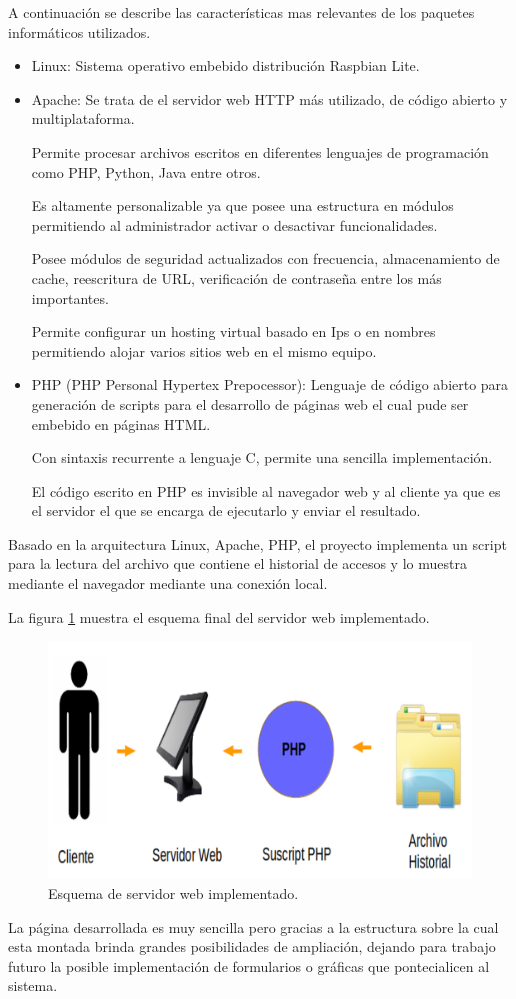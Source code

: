 A continuación se describe las características mas relevantes de los paquetes informáticos utilizados.

\begin{itemize}

\item Linux: Sistema operativo embebido distribución Raspbian Lite.

\item Apache: Se trata de el servidor web HTTP más utilizado, de código abierto y multiplataforma.

Permite procesar archivos escritos en diferentes lenguajes de programación como PHP, Python, Java entre otros.

Es altamente personalizable ya que posee una estructura en módulos permitiendo al administrador 	activar o desactivar funcionalidades.

Posee módulos de seguridad actualizados con frecuencia, almacenamiento de cache, reescritura de URL, verificación de contraseña entre los más importantes.

Permite configurar un hosting virtual basado en Ips o en nombres permitiendo alojar varios sitios web en el mismo equipo.

\item PHP (PHP Personal Hypertex Prepocessor): Lenguaje de código abierto para generación de scripts para el desarrollo de páginas web el cual pude ser embebido en páginas HTML.

Con sintaxis recurrente a lenguaje C, permite una sencilla implementación. 

El código escrito en PHP es invisible al navegador web y al cliente ya que es el servidor el que se encarga de ejecutarlo y enviar el resultado.

\end{itemize}

Basado en la arquitectura Linux, Apache, PHP, el proyecto implementa un script para la lectura del archivo que contiene el historial de accesos y lo muestra mediante el navegador mediante una conexión local.

La figura \ref{fig:servidor} muestra el esquema final del servidor web implementado.

\begin{figure}[h]
	\centering
	\includegraphics[scale =.3]{./Figures/servidor.png}
	\caption{Esquema de servidor web implementado.}
	\label{fig:servidor}
\end{figure}

La página desarrollada es muy sencilla pero gracias a la estructura sobre la cual esta montada brinda grandes posibilidades de ampliación, dejando para trabajo futuro la posible implementación de formularios o gráficas que pontecialicen al sistema.




